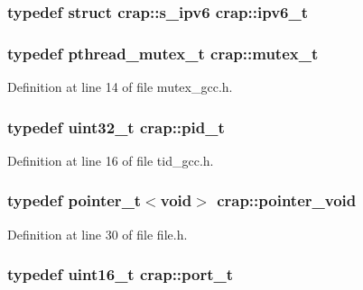 \subsubsection[{ipv6\+\_\+t}]{\setlength{\rightskip}{0pt plus 5cm}typedef struct {\bf crap\+::s\+\_\+ipv6}
 {\bf crap\+::ipv6\+\_\+t}}\label{namespacecrap_a73628169b6e7ba09cff516478c11b401}
\hypertarget{namespacecrap_a1a552340e5d6bb679ebde38c74a802a8}{}
\subsubsection[{mutex\+\_\+t}]{\setlength{\rightskip}{0pt plus 5cm}typedef pthread\+\_\+mutex\+\_\+t {\bf crap\+::mutex\+\_\+t}}\label{namespacecrap_a1a552340e5d6bb679ebde38c74a802a8}


Definition at line 14 of file mutex\+\_\+gcc.\+h.

\hypertarget{namespacecrap_a16bdcfd808340c5c364a5c78bbb1f39a}{}
\subsubsection[{pid\+\_\+t}]{\setlength{\rightskip}{0pt plus 5cm}typedef uint32\+\_\+t {\bf crap\+::pid\+\_\+t}}\label{namespacecrap_a16bdcfd808340c5c364a5c78bbb1f39a}


Definition at line 16 of file tid\+\_\+gcc.\+h.

\hypertarget{namespacecrap_aa4cb82451ede6b73c49d862af29aebb3}{}
\subsubsection[{pointer\+\_\+void}]{\setlength{\rightskip}{0pt plus 5cm}typedef {\bf pointer\+\_\+t}$<$void$>$ {\bf crap\+::pointer\+\_\+void}}\label{namespacecrap_aa4cb82451ede6b73c49d862af29aebb3}


Definition at line 30 of file file.\+h.

\hypertarget{namespacecrap_a21d8c14ae6ca715c519ff369042149dd}{}
\subsubsection[{port\+\_\+t}]{\setlength{\rightskip}{0pt plus 5cm}typedef uint16\+\_\+t {\bf crap\+::port\+\_\+t}}\label{namespacecrap_a21d8c14ae6ca715c519ff369042149dd}


